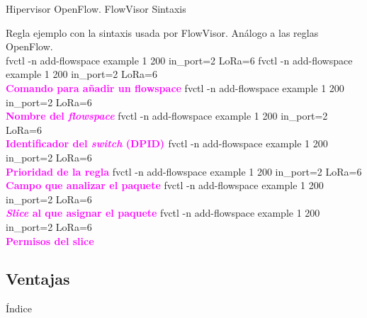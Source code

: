 \documentclass{beamer}
\begin{document}
\begin{frame}{Hipervisor OpenFlow. FlowVisor Sintaxis}\vspace{25pt}
   \begin{overlayarea}{\textwidth}{6cm}
   Regla ejemplo con la sintaxis usada por FlowVisor. Análogo a las reglas OpenFlow.\vspace{15pt}\\
    {fvctl -n add-flowspace example 1 200 in\_port=2 LoRa=6}
    {\alert{fvctl -n add-flowspace} example 1 200 in\_port=2 LoRa=6\\[20pt]
            \centering \large \textbf{\textcolor{magenta}{Comando para añadir un flowspace}}}
    {fvctl -n add-flowspace \alert{example} 1 200 in\_port=2 LoRa=6\\[20pt]
            \centering \large \textbf{\textcolor{magenta}{Nombre del \textit{flowspace}}}}
    {fvctl -n add-flowspace example \alert{1} 200 in\_port=2 LoRa=6\\[20pt]
            \centering \large \textbf{\textcolor{magenta}{Identificador del \textit{switch} (DPID) }}}
    {fvctl -n add-flowspace example 1 \alert{200} in\_port=2 LoRa=6\\[20pt]
            \centering \large \textbf{\textcolor{magenta}{Prioridad de la regla}}}
    {fvctl -n add-flowspace example 1 200 \alert{in\_port=2} LoRa=6\\[20pt]
            \centering \large \textbf{\textcolor{magenta}{Campo que analizar el paquete}}}
    {fvctl -n add-flowspace example 1 200 in\_port=2 \alert{LoRa}=6\\[20pt]
            \centering \large \textbf{\textcolor{magenta}{\textit{Slice} al que asignar el paquete}}}
    {fvctl -n add-flowspace example 1 200 in\_port=2 LoRa\alert{=6}\\[20pt]
            \centering \large \textbf{\textcolor{magenta}{Permisos del slice}}}
    \end{overlayarea}
\end{frame}

\subsection{Ventajas}
\begin{frame}{Índice}
    \begin{columns}[t]
        \begin{column}{1.7in}
            \tableofcontents[currentsection, subsectionstyle=show/shaded/hide, sections={1-4}]
        \end{column}
        \begin{column}{1.7in}
            \tableofcontents[currentsection, subsectionstyle=show/shaded/hide, sections={5-7}]
        \end{column}
    \end{columns}
\end{frame}
\end{document}
